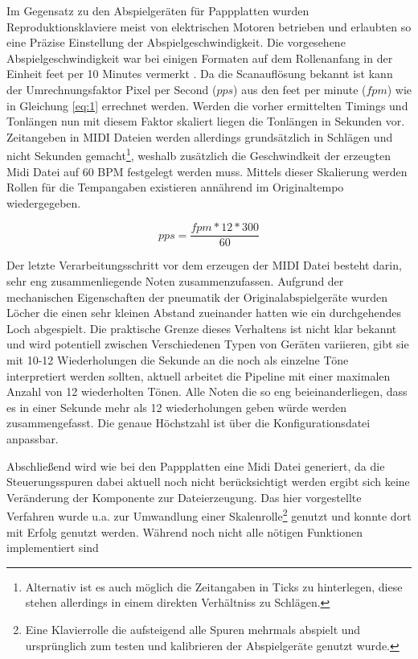 Im Gegensatz zu den Abspielgeräten für Pappplatten wurden Reproduktionsklaviere meist von elektrischen Motoren betrieben und erlaubten so eine Präzise Einstellung der Abspielgeschwindigkeit.
Die vorgesehene Abspielgeschwindigkeit war bei einigen Formaten auf dem Rollenanfang in der Einheit feet per 10 Minutes vermerkt \parencite[63]{colmenares_2011}.
Da die Scanauflösung bekannt ist kann der Umrechnungsfaktor Pixel per Second ($pps$) aus den feet per minute ($fpm$) wie in Gleichung \ref{eq:1} errechnet werden.
Werden die vorher ermittelten Timings und Tonlängen nun mit diesem Faktor skaliert liegen die Tonlängen in Sekunden vor.
Zeitangeben in MIDI Dateien werden allerdings grundsätzlich in Schlägen und nicht Sekunden gemacht\footnote{Alternativ ist es auch möglich die Zeitangaben in Ticks zu hinterlegen, diese stehen allerdings in einem direkten Verhältniss zu Schlägen.}, weshalb zusätzlich die Geschwindkeit der erzeugten Midi Datei auf 60 BPM festgelegt werden muss.
Mittels dieser Skalierung werden Rollen für die Tempangaben existieren annährend im Originaltempo wiedergegeben.

\begin{equation} \label{eq:1}
    pps = \frac{fpm * 12 * 300}{60}
\end{equation}

Der letzte Verarbeitungsschritt vor dem erzeugen der MIDI Datei besteht darin, sehr eng zusammenliegende Noten zusammenzufassen.
Aufgrund der mechanischen Eigenschaften der pneumatik der Originalabspielgeräte wurden Löcher die einen sehr kleinen Abstand zueinander hatten wie ein durchgehendes Loch abgespielt.
Die praktische Grenze dieses Verhaltens ist nicht klar bekannt und wird potentiell zwischen Verschiedenen Typen von Geräten variieren, \textcite[7]{zoltan_1994} gibt sie mit 10-12 Wiederholungen die Sekunde an die noch als einzelne Töne interpretiert werden sollten, aktuell arbeitet die Pipeline mit einer maximalen Anzahl von 12 wiederholten Tönen.
Alle Noten die so eng beieinanderliegen, dass es in einer Sekunde mehr als 12 wiederholungen geben würde werden zusammengefasst.
Die genaue Höchstzahl ist über die Konfigurationsdatei anpassbar.

Abschließend wird wie bei den Pappplatten eine Midi Datei generiert, da die Steuerungsspuren dabei aktuell noch nicht berücksichtigt werden ergibt sich keine Veränderung der Komponente zur Dateierzeugung.
Das hier vorgestellte Verfahren wurde u.a. zur Umwandlung einer Skalenrolle\footnote{Eine Klavierrolle die aufsteigend alle Spuren mehrmals abspielt und ursprünglich zum testen und kalibrieren der Abspielgeräte genutzt wurde.} genutzt und konnte dort mit Erfolg genutzt werden.
Während noch nicht alle nötigen Funktionen implementiert sind %